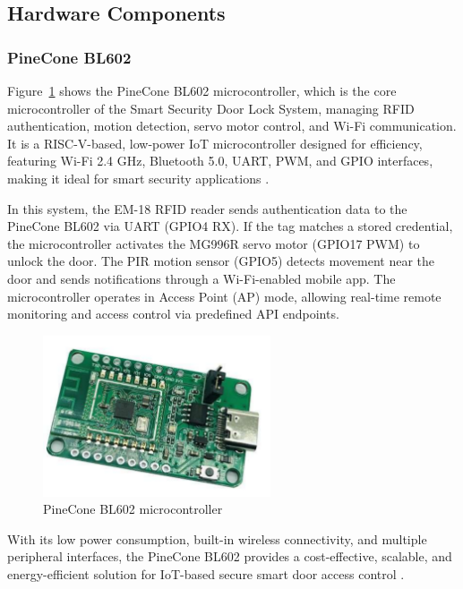 \documentclass[a4paper]{scrartcl}
\begin{document}
\subsection{Hardware Components}
\subsubsection{PineCone BL602}

Figure~\ref{fig:Pine} shows the PineCone BL602 microcontroller, which is the core microcontroller of the Smart Security Door Lock System, managing RFID authentication, motion detection, servo motor control, and Wi-Fi communication. It is a RISC-V-based, low-power IoT microcontroller designed for efficiency, featuring Wi-Fi 2.4 GHz, Bluetooth 5.0, UART, PWM, and GPIO interfaces, making it ideal for smart security applications \cite{BL602Datasheet}.

In this system, the EM-18 RFID reader \cite{EM18Datasheet} sends authentication data to the PineCone BL602 via UART (GPIO4 RX). If the tag matches a stored credential, the microcontroller activates the MG996R servo motor (GPIO17 PWM) \cite{MG996RServoMotor} to unlock the door. The PIR motion sensor (GPIO5) detects movement near the door and sends notifications through a Wi-Fi-enabled mobile app. The microcontroller operates in Access Point (AP) mode, allowing real-time remote monitoring and access control via predefined API endpoints.

\begin{figure}[H] %
    \centering
    \includegraphics[width=0.6\textwidth]{Pine.pdf}
    \caption{PineCone BL602 microcontroller}
    \label{fig:Pine}
\end{figure}

With its low power consumption, built-in wireless connectivity, and multiple peripheral interfaces, the PineCone BL602 provides a cost-effective, scalable, and energy-efficient solution for IoT-based secure smart door access control \cite{BL602Datasheet}.
\end{document}
